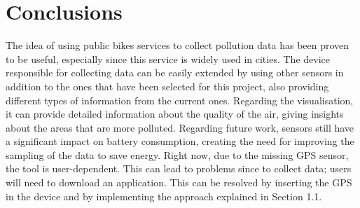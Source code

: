 \documentclass[12pt]{article}
\begin{document}
  \section{Conclusions}
  The idea of using public bikes services to collect pollution data has been proven to be useful, especially since this service is widely used in cities. The device responsible for collecting data can be easily extended by using other sensors in addition to the ones that have been selected for this project, also providing different types of information from the current ones. Regarding the visualisation, it can provide detailed information about the quality of the air, giving insights about the areas that are more polluted. Regarding future work, sensors still have a significant impact on battery consumption, creating the need for improving the sampling of the data to save energy.  Right now, due to the missing GPS sensor, the tool is user-dependent. This can lead to problems since to collect data; users will need to download an application. This can be resolved by inserting the GPS in the device and by implementing the approach explained in Section 1.1.   
\end{document}
